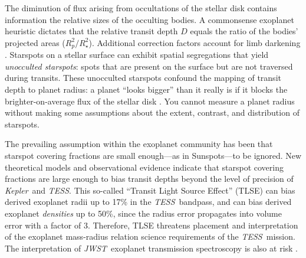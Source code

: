 \documentclass[twocolumn]{aastex631}
\newcommand{\tess}{{\it TESS}}
\newcommand{\jwst}{{\it JWST}}
\newcommand{\kepler}{{\it Kepler}}
\begin{document}
The diminution of flux arising from occultations of the stellar disk contains information the relative sizes of the occulting bodies.  A commonsense exoplanet heuristic dictates that the relative transit depth $D$ equals the ratio of the bodies' projected areas ($R_p^2/R_\star^2$).  Additional correction factors account for limb darkening \citep{2002ApJ...580L.171M}.  Starspots on a stellar surface can exhibit spatial segregations
that yield \emph{unocculted starspots}: spots that are present on the surface but are not traversed during transits.  These unocculted starspots confound the mapping of transit depth to planet radius: a planet ``looks bigger'' than it really is if it blocks the brighter-on-average flux of the stellar disk \citep{2018AJ....156...91M}.  You cannot measure a planet radius without making some assumptions about the extent, contrast, and distribution of starspots.

The prevailing assumption within the exoplanet community has been that starspot covering fractions are small enough---as in Sunspots---to be ignored.  New theoretical models \citep{2018ApJ...853..122R} and observational evidence \citep{2016MNRAS.463.2494F} indicate that starspot covering fractions are large enough to bias transit depths beyond the level of precision of \kepler\ and \tess.  This so-called ``Transit Light Source Effect'' (TLSE) can bias derived exoplanet radii up to 17\% in the \tess\ bandpass, and can bias derived exoplanet \emph{densities} up to 50\%, since the radius error propagates into volume error with a factor of 3.  Therefore, TLSE threatens placement and interpretation of the exoplanet mass-radius relation science requirements of the \tess\ mission.  The interpretation of \jwst\ exoplanet transmission spectroscopy is also at risk \citep{2019AJ....157...11W}.
\end{document}
